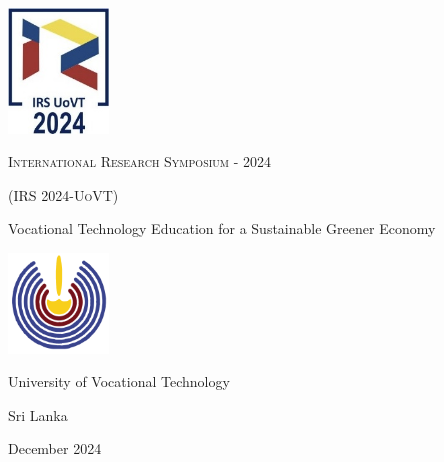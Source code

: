 



\begin{titlepage}
    \centering
    \includegraphics[width=0.2\textwidth]{Images/Logo.jpeg}\par\vspace{1.5cm}
    {\scshape\LARGE International Research Symposium - 2024 \par}
    {\scshape\Large (IRS 2024-UoVT)\par}
    \vspace{2.5cm}
    {\huge  Vocational Technology Education for a Sustainable Greener Economy \par}
    \vspace{2cm}
    \includegraphics[width=0.2\textwidth]{Images/Unilogo.png}\\
    \vspace{2.5cm}
    {\Large University of Vocational Technology\par}
    {\Large Sri Lanka\par}
    \vfill
    {\large December 2024\par}

\end{titlepage}